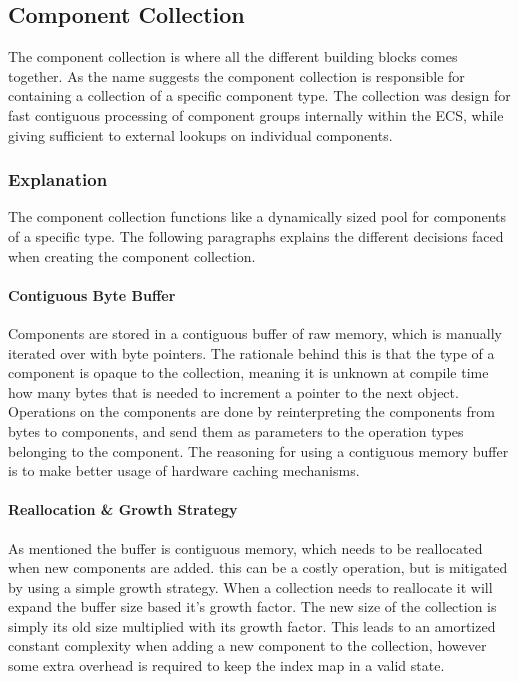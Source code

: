 \subsection{Component Collection}
\label{subsec:detailed_component_collection}
The component collection is where all the different building blocks
comes together.
As the name suggests the component collection is responsible for containing
a collection of a specific component type.
The collection was design for fast contiguous processing of component groups internally within the ECS,
while giving sufficient to external lookups on individual components.

\subsubsection{Explanation}
The component collection functions like a dynamically sized pool for components of a specific type.
The following paragraphs explains the different decisions faced when creating the component collection.

\paragraph{Contiguous Byte Buffer}
Components are stored in a contiguous buffer of raw memory,
which is manually iterated over with byte pointers.
The rationale behind this is that the type of a component is opaque
to the collection, meaning it is unknown at compile time
how many bytes that is needed to increment a pointer to the next object.
Operations on the components are done by reinterpreting the components from bytes to components,
and send them as parameters to the operation types belonging to the component.
The reasoning for using a contiguous memory buffer is to make better usage of hardware caching mechanisms.

\paragraph{Reallocation \& Growth Strategy}
As mentioned the buffer is contiguous memory, which needs to be reallocated when new components are added.
this can be a costly operation, but is mitigated by using a simple growth strategy.
When a collection needs to reallocate it will expand the buffer size based it's growth factor.
The new size of the collection is simply its old size multiplied with its growth factor.
This leads to an amortized constant complexity when adding a new component to the collection,
however some extra overhead is required to keep the index map in a valid state.

